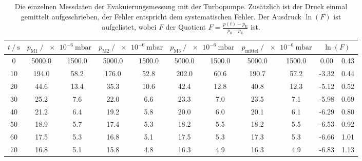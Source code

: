   \begin{table}[h]
    \centering
    \caption{Die einzelnen Messdaten der Evakuierungsmessung mit der Turbopumpe. 
    Zusätzlich ist der Druck einmal gemittelt aufgeschrieben, der Fehler entspricht dem systematischen Fehler. 
    Der Ausdruck $\ln(F)$ ist aufgelistet, wobei $F$ der Quotient $F = \frac{p(t) - p_\text{E}}{p_0 - p_\text{E}}$ ist. }
    \label{tab:turbo_eva}
    \begin{tabular}{ S[table-format=3.0] S @{${}\pm{}$} S S @{${}\pm{}$} S  S @{${}\pm{}$} S S @{${}\pm{}$} S S[table-format=2.2] @{${}\pm{}$} S[table-format=1.2]}
      \toprule
      {$t \mathbin{/} \si{\second}$} &  &  &  &  &  \\
       & 5000.0 & 1500.0 & 5000.0 & 1500.0 & 5000.0 & 1500.0 & 5000.0 & 1500.0 &   0.00 & 0.43 \\
       10 &  194.0 &   58.2 &  176.0 &   52.8 &  202.0 &   60.6 &  190.7 &   57.2 &  -3.32 & 0.44 \\
       20 &   44.6 &   13.4 &   35.3 &   10.6 &   42.4 &   12.8 &   40.8 &   12.3 &  -5.12 & 0.52 \\
       30 &   25.2 &    7.6 &   22.0 &    6.6 &   23.3 &    7.0 &   23.5 &    7.1 &  -5.98 & 0.69 \\
       40 &   21.2 &    6.4 &   19.2 &    5.8 &   20.0 &    6.0 &   20.1 &    6.1 &  -6.29 & 0.80 \\
       50 &   18.9 &    5.7 &   17.4 &    5.3 &   18.2 &    5.5 &   18.2 &    5.5 &  -6.53 & 0.92 \\
       60 &   17.5 &    5.3 &   16.8 &    5.1 &   17.5 &    5.3 &   17.3 &    5.3 &  -6.66 & 1.01 \\
       70 &   16.8 &    5.1 &   15.8 &    4.8 &   16.3 &    4.9 &   16.3 &    4.9 &  -6.83 & 1.13 \\

\end{tabular}
\end{table}
